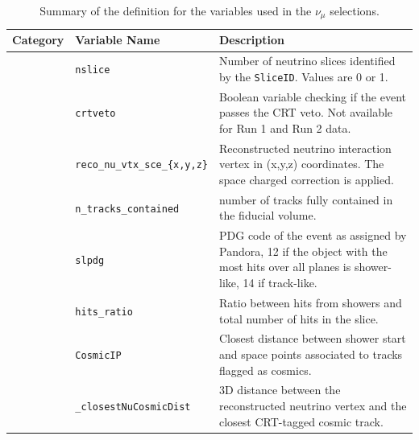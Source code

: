 \begin{table}[H]
\caption{\label{tab:numuvariableSummary} Summary of the definition for the variables used in the $\nu_{\mu}$ selections.}
\centering
\begin{tabular}{ m{} | m{} | m{}  }
Category & Variable Name & Description  \\
\hline

\multicolumn{1}{l|}{} & \texttt{nslice} &  Number of neutrino slices identified by the \texttt{SliceID}. Values are  0 or 1.\\  \cline{2-3}
\multicolumn{1}{l|}{} & \texttt{crtveto} & Boolean variable checking if the event passes the CRT veto. Not available for Run 1 and Run 2 data. \\  \cline{2-3}
\multicolumn{1}{l|}{} & \texttt{reco\_nu\_vtx\_sce\_\{x,y,z\}} & Reconstructed neutrino interaction vertex in (x,y,z) coordinates. The space charged correction is applied.  \\  \cline{2-3}
\multicolumn{1}{l|}{} & \texttt{n\_tracks\_contained} &  number of tracks fully contained in the fiducial volume.\\  \cline{2-3}
\multicolumn{1}{l|}{} & \texttt{slpdg} &  PDG code of the event as assigned by Pandora, 12 if the object with the most hits over all planes is shower-like, 14 if track-like.\\  \cline{2-3}
\parbox[t]{2mm}{} & \texttt{hits\_ratio} & Ratio between hits from showers and total number of hits in the slice. \\  
 & \texttt{CosmicIP} & Closest distance between shower start and space points associated to tracks flagged as cosmics. \\  
 & \texttt{\_closestNuCosmicDist} &  3D distance between the reconstructed neutrino vertex and the closest CRT-tagged cosmic track. \\  
\hline


\end{tabular}
\end{table}
